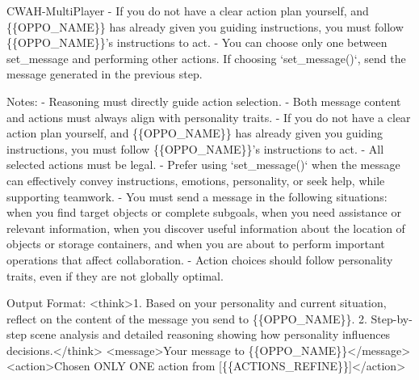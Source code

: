 \documentclass{article}
\theoremstyle{plain}
\theoremstyle{definition}
\theoremstyle{remark}
\begin{document}
\begin{myexample}{CWAH-MultiPlayer}
   - If you do not have a clear action plan yourself, and \{\{OPPO\_NAME\}\} has already given you guiding instructions, you must follow \{\{OPPO\_NAME\}\}'s instructions to act.
   - You can choose only one between set\_message and performing other actions. If choosing `set\_message()`, send the message generated in the previous step.
\leavevmode\par
Notes:
- Reasoning must directly guide action selection.
- Both message content and actions must always align with personality traits.
- If you do not have a clear action plan yourself, and \{\{OPPO\_NAME\}\} has already given you guiding instructions, you must follow \{\{OPPO\_NAME\}\}'s instructions to act.
- All selected actions must be legal.
- Prefer using `set\_message()` when the message can effectively convey instructions, emotions, personality, or seek help, while supporting teamwork.
- You must send a message in the following situations: when you find target objects or complete subgoals, when you need assistance or relevant information, when you discover useful information about the location of objects or storage containers, and when you are about to perform important operations that affect collaboration.
- Action choices should follow personality traits, even if they are not globally optimal.
\leavevmode\par
Output Format:
<think>1. Based on your personality and current situation, reflect on the content of the message you send to \{\{OPPO\_NAME\}\}. 2. Step-by-step scene analysis and detailed reasoning showing how personality influences decisions.</think>
<message>Your message to \{\{OPPO\_NAME\}\}</message>
<action>Chosen ONLY ONE action from [\{\{ACTIONS\_REFINE\}\}]</action>
\end{myexample}
\end{document}
